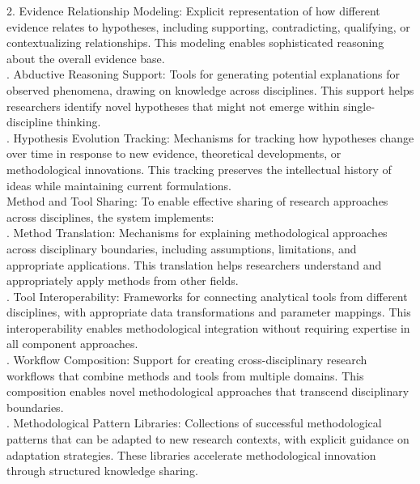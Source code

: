 2. Evidence Relationship Modeling: Explicit representation of how different evidence relates to hypotheses, including supporting, contradicting, qualifying, or contextualizing relationships. This modeling enables sophisticated reasoning about the overall evidence base.\\ . Abductive Reasoning Support: Tools for generating potential explanations for observed phenomena, drawing on knowledge across disciplines. This support helps researchers identify novel hypotheses that might not emerge within single-discipline thinking.\\ . Hypothesis Evolution Tracking: Mechanisms for tracking how hypotheses change over time in response to new evidence, theoretical developments, or methodological innovations. This tracking preserves the intellectual history of ideas while maintaining current formulations.\\ \newline
Method and Tool Sharing: To enable effective sharing of research approaches across disciplines, the system implements:\\ . Method Translation: Mechanisms for explaining methodological approaches across disciplinary boundaries, including assumptions, limitations, and appropriate applications. This translation helps researchers understand and appropriately apply methods from other fields.\\ . Tool Interoperability: Frameworks for connecting analytical tools from different disciplines, with appropriate data transformations and parameter mappings. This interoperability enables methodological integration without requiring expertise in all component approaches.\\ . Workflow Composition: Support for creating cross-disciplinary research workflows that combine methods and tools from multiple domains. This composition enables novel methodological approaches that transcend disciplinary boundaries.\\ . Methodological Pattern Libraries: Collections of successful methodological patterns that can be adapted to new research contexts, with explicit guidance on adaptation strategies. These libraries accelerate methodological innovation through structured knowledge sharing.\\
